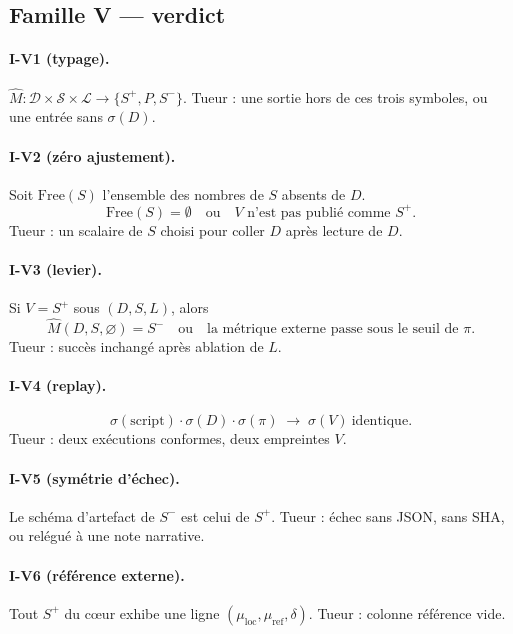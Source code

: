 \documentclass[11pt,a4paper]{article}
\newcommand{\Mhat}{\hat{M}}
\theoremstyle{definition}
\begin{document}
\subsection{Famille V --- verdict}

\paragraph{I-V1 (typage).}
$\Mhat:\mathcal{D}\times\mathcal{S}\times\mathcal{L}\to\{S^{+},P,S^{-}\}$.
Tueur : une sortie hors de ces trois symboles, ou une entrée sans $\sigma(D)$.

\paragraph{I-V2 (zéro ajustement).}
Soit $\mathrm{Free}(S)$ l'ensemble des nombres de $S$ absents de $D$.
\[
\mathrm{Free}(S)=\emptyset
\quad\text{ou}\quad
V\text{ n'est pas publié comme }S^{+}.
\]
Tueur : un scalaire de $S$ choisi pour coller $D$ après lecture de $D$.

\paragraph{I-V3 (levier).}
Si $V=S^{+}$ sous $(D,S,L)$, alors
\[
\Mhat(D,S,\varnothing)=S^{-}
\quad\text{ou}\quad
\text{la métrique externe passe sous le seuil de }\pi.
\]
Tueur : succès inchangé après ablation de $L$.

\paragraph{I-V4 (replay).}
\[
\sigma(\mathrm{script})\cdot\sigma(D)\cdot\sigma(\pi)
\;\longrightarrow\;
\sigma(V)\ \text{identique}.
\]
Tueur : deux exécutions conformes, deux empreintes $V$.

\paragraph{I-V5 (symétrie d'échec).}
Le schéma d'artefact de $S^{-}$ est celui de $S^{+}$.
Tueur : échec sans JSON, sans SHA, ou relégué à une note narrative.

\paragraph{I-V6 (référence externe).}
Tout $S^{+}$ du cœur exhibe une ligne
$(\mu_{\mathrm{loc}},\mu_{\mathrm{ref}},\delta)$.
Tueur : colonne référence vide.
\end{document}
